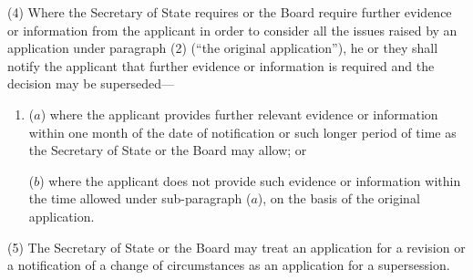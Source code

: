 \documentclass[12pt,a4paper]{article}
\begin{document}
(4) Where the Secretary of State requires 
or the Board require  %
further evidence or information from the applicant in order to consider all the issues raised by an application under paragraph (2) (“the original application”), he 
or they  %
shall notify the applicant that further evidence or information is required and the decision may be superseded—
\begin{enumerate}\item[]
($a$) where the applicant provides further relevant evidence or information within one month of the date of notification or such longer period of time as the Secretary of State 
or the Board  %
may allow; or

($b$) where the applicant does not provide such evidence or information within the time allowed under sub-paragraph ($a$), on the basis of the original application.
\end{enumerate}

(5) The Secretary of State 
or the Board  %
may treat an application for a revision or a notification of a change of circumstances as an application for a supersession.
\end{document}
